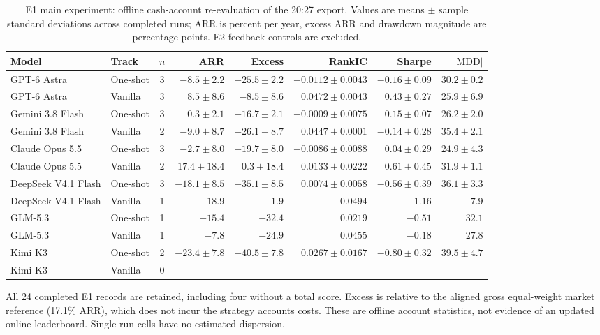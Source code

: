 \begin{table}[htbp]
\centering
\footnotesize
\caption{E1 main experiment: offline cash-account re-evaluation of the 20:27 export. Values are means $\pm$ sample standard deviations across completed runs; ARR is percent per year, excess ARR and drawdown magnitude are percentage points. E2 feedback controls are excluded.}
\label{tab:cash_results}
\setlength{\tabcolsep}{3pt}
\begin{tabular}{@{}llcrrrrr@{}}
\toprule
Model & Track & $n$ & ARR & Excess & RankIC & Sharpe & $|\mathrm{MDD}|$ \\
\midrule
GPT-6 Astra & One-shot & 3 & $-8.5 \pm 2.2$ & $-25.5 \pm 2.2$ & $-0.0112 \pm 0.0043$ & $-0.16 \pm 0.09$ & $30.2 \pm 0.2$ \\
GPT-6 Astra & Vanilla & 3 & $8.5 \pm 8.6$ & $-8.5 \pm 8.6$ & $0.0472 \pm 0.0043$ & $0.43 \pm 0.27$ & $25.9 \pm 6.9$ \\
Gemini 3.8 Flash & One-shot & 3 & $0.3 \pm 2.1$ & $-16.7 \pm 2.1$ & $-0.0009 \pm 0.0075$ & $0.15 \pm 0.07$ & $26.2 \pm 2.0$ \\
Gemini 3.8 Flash & Vanilla & 2 & $-9.0 \pm 8.7$ & $-26.1 \pm 8.7$ & $0.0447 \pm 0.0001$ & $-0.14 \pm 0.28$ & $35.4 \pm 2.1$ \\
Claude Opus 5.5 & One-shot & 3 & $-2.7 \pm 8.0$ & $-19.7 \pm 8.0$ & $-0.0086 \pm 0.0088$ & $0.04 \pm 0.29$ & $24.9 \pm 4.3$ \\
Claude Opus 5.5 & Vanilla & 2 & $17.4 \pm 18.4$ & $0.3 \pm 18.4$ & $0.0133 \pm 0.0222$ & $0.61 \pm 0.45$ & $31.9 \pm 1.1$ \\
DeepSeek V4.1 Flash & One-shot & 3 & $-18.1 \pm 8.5$ & $-35.1 \pm 8.5$ & $0.0074 \pm 0.0058$ & $-0.56 \pm 0.39$ & $36.1 \pm 3.3$ \\
DeepSeek V4.1 Flash & Vanilla & 1 & $18.9$ & $1.9$ & $0.0494$ & $1.16$ & $7.9$ \\
GLM-5.3 & One-shot & 1 & $-15.4$ & $-32.4$ & $0.0219$ & $-0.51$ & $32.1$ \\
GLM-5.3 & Vanilla & 1 & $-7.8$ & $-24.9$ & $0.0455$ & $-0.18$ & $27.8$ \\
Kimi K3 & One-shot & 2 & $-23.4 \pm 7.8$ & $-40.5 \pm 7.8$ & $0.0267 \pm 0.0167$ & $-0.80 \pm 0.32$ & $39.5 \pm 4.7$ \\
Kimi K3 & Vanilla & 0 & -- & -- & -- & -- & -- \\
\bottomrule
\end{tabular}
\par\smallskip
\begin{minipage}{\linewidth}\footnotesize All 24 completed E1 records are retained, including four without a total score. Excess is relative to the aligned gross equal-weight market reference (17.1\% ARR), which does not incur the strategy account\textquotesingle s costs. These are offline account statistics, not evidence of an updated online leaderboard. Single-run cells have no estimated dispersion.\end{minipage}
\end{table}
